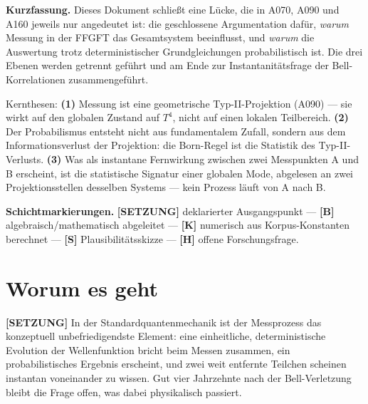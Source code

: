 
\providecommand{\qedsq}{\raisebox{0.03em}{\framebox[0.62em]{\rule{0pt}{0.42em}}}}

\begingroup\small\noindent
\textbf{Kurzfassung.}
Dieses Dokument schließt eine Lücke, die in A070, A090 und A160 jeweils
nur angedeutet ist: die geschlossene Argumentation dafür, \emph{warum}
Messung in der FFGFT das Gesamtsystem beeinflusst, und \emph{warum}
die Auswertung trotz deterministischer Grundgleichungen probabilistisch
ist. Die drei Ebenen werden getrennt geführt und am Ende zur
Instantanitätsfrage der Bell-Korrelationen zusammengeführt.

Kernthesen:
\textbf{(1)} Messung ist eine geometrische Typ-II-Projektion (A090) --- sie
wirkt auf den globalen Zustand auf $T^4$, nicht auf einen lokalen Teilbereich.
\textbf{(2)} Der Probabilismus entsteht nicht aus fundamentalem Zufall, sondern
aus dem Informationsverlust der Projektion: die Born-Regel ist die Statistik des
Typ-II-Verlusts.
\textbf{(3)} Was als instantane Fernwirkung zwischen zwei Messpunkten A und B
erscheint, ist die statistische Signatur einer globalen Mode, abgelesen an zwei
Projektionsstellen desselben Systems --- kein Prozess läuft von A nach B.
\par\endgroup

\bigskip

\begingroup\small\noindent
\textbf{Schichtmarkierungen.}
\textbf{[SETZUNG]} deklarierter Ausgangspunkt ---
\textbf{[B]} algebraisch/mathematisch abgeleitet ---
\textbf{[K]} numerisch aus Korpus-Konstanten berechnet ---
\textbf{[S]} Plausibilitätsskizze ---
\textbf{[H]} offene Forschungsfrage.
\par\endgroup

\bigskip

\section{Worum es geht}

\textbf{[SETZUNG]} In der Standardquantenmechanik ist der Messprozess
das konzeptuell unbefriedigendste Element: eine einheitliche, deterministische
Evolution der Wellenfunktion bricht beim Messen zusammen, ein probabilistisches
Ergebnis erscheint, und zwei weit entfernte Teilchen scheinen instantan
voneinander zu wissen. Gut vier Jahrzehnte nach der Bell-Verletzung bleibt die Frage
offen, was dabei physikalisch passiert.

